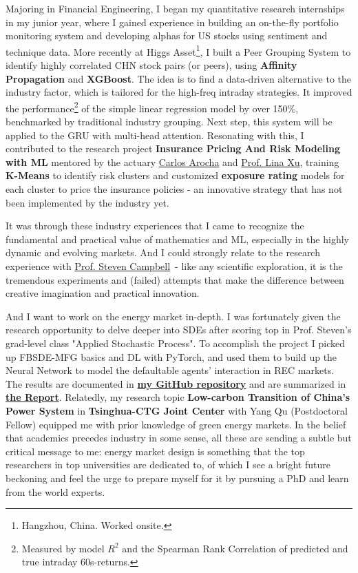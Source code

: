 \documentclass[12pt, a4paper]{article}
\newcommand{\Report}{\href{https://github.com/OrangeAoo/Multi-Compliance-MFG-FBSDEs/blob/ca6adb57636c1fc1ff9daea8d57f004e5762fd4d/FinalReports/Report-v3.pdf}{\textbf{the Report}\xspace}}
\newcommand{\GitHubMFG}{\href{https://github.com/OrangeAoo/Multi-Period-Compliance-MFG-FBSDEs}{\textbf{my GitHub repository}}\xspace}
\newcommand{\Lowcarb}{Low-carbon Transition of China's Power System\xspace}
\newcommand{\InsurP}{Insurance Pricing And Risk Modeling with ML\xspace}
\newcommand{\Higgs}{Higgs Asset\footnote{Hangzhou, China. Worked onsite.}\xspace}
\newcommand{\TCJC}{Tsinghua-CTG Joint Center\xspace}
\newcommand{\SC}{\href{https://www.stevenacampbell.com/}{Prof. Steven Campbell}\xspace}
\newcommand{\YQ}{Yang Qu (Postdoctoral Fellow)\xspace}
\newcommand{\CA}{\href{https://www.linkedin.com/in/carocha/?originalSubdomain=ch}{Carlos Arocha}\xspace}
\newcommand{\LX}{\href{https://sps.columbia.edu/person/lina-xu}{Prof. Lina Xu}}
\begin{document}
Majoring in Financial Engineering, I began my quantitative research internships in my junior year, where I gained experience in building an on-the-fly portfolio monitoring system and developing alphas for US stocks using sentiment and technique data. More recently at \Higgs, I built a Peer Grouping System to identify highly correlated CHN stock pairs (or peers), using \textbf{Affinity Propagation} and \textbf{XGBoost}. The idea is to find a data-driven alternative to the industry factor, which is tailored for the high-freq intraday strategies. It improved the performance\footnote{Measured by model $R^2$ and the Spearman Rank Correlation of predicted and true intraday 60s-returns.} of the simple linear regression model by over 150\%, benchmarked by traditional industry grouping. Next step, this system will be applied to the GRU with multi-head attention. %
Resonating with this, I contributed to the research project \textbf{\InsurP} mentored by the actuary \CA and \LX, training \textbf{K-Means} to identify risk clusters and customized \textbf{exposure rating} models for each cluster to price the insurance policies - an innovative strategy that has not been implemented by the industry yet.

It was through these industry experiences that I came to recognize the fundamental and practical value of mathematics and ML, especially in the highly dynamic and evolving markets. And I could strongly relate to the research experience with \SC\ - like any scientific exploration, it is the tremendous experiments and (failed) attempts that make the difference between creative imagination and practical innovation.

And I want to work on the energy market in-depth. I was fortunately given the research opportunity to delve deeper into SDEs after scoring top in Prof. Steven's grad-level class "Applied Stochastic Process". To accomplish the project I picked up FBSDE-MFG basics and DL with PyTorch, and used them to build up the Neural Network to model the defaultable agents' interaction in REC markets. The results are documented in \GitHubMFG and are summarized in \Report. Relatedly, my research topic \textbf{\Lowcarb} in \textbf{\TCJC} with \YQ equipped me with prior knowledge of green energy markets. In the belief that academics precedes industry in some sense, all these are sending a subtle but critical message to me: energy market design is something that the top researchers in top universities are dedicated to, of which I see a bright future beckoning and feel the urge to prepare myself for it by pursuing a PhD and learn from the world experts.
\end{document}

